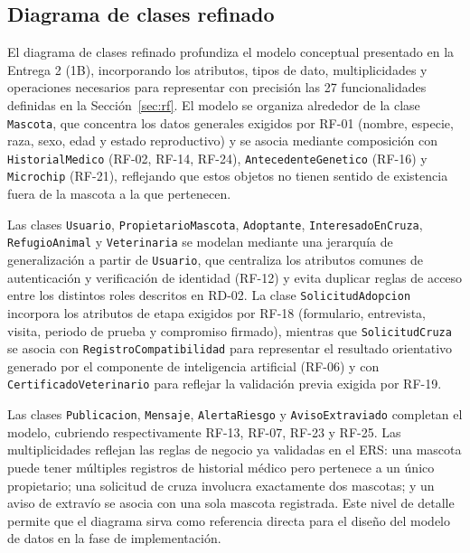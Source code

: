 \documentclass[journal,onecolumn]{IEEEtran}
\begin{document}
	\subsection{Diagrama de clases refinado}
	\label{sec:clases-refinado}
	
	El diagrama de clases refinado profundiza el modelo conceptual presentado en
	la Entrega 2 (1B), incorporando los atributos, tipos de dato,
	multiplicidades y operaciones necesarios para representar con precisión las
	27 funcionalidades definidas en la Sección~\ref{sec:rf}. El modelo se
	organiza alrededor de la clase \texttt{Mascota}, que concentra los datos
	generales exigidos por RF-01 (nombre, especie, raza, sexo, edad y estado
	reproductivo) y se asocia mediante composición con \texttt{HistorialMedico}
	(RF-02, RF-14, RF-24), \texttt{AntecedenteGenetico} (RF-16) y
	\texttt{Microchip} (RF-21), reflejando que estos objetos no tienen sentido
	de existencia fuera de la mascota a la que pertenecen.
	
	Las clases \texttt{Usuario}, \texttt{PropietarioMascota},
	\texttt{Adoptante}, \texttt{InteresadoEnCruza}, \texttt{RefugioAnimal} y
	\texttt{Veterinaria} se modelan mediante una jerarquía de generalización a
	partir de \texttt{Usuario}, que centraliza los atributos comunes de
	autenticación y verificación de identidad (RF-12) y evita duplicar reglas de
	acceso entre los distintos roles descritos en RD-02. La clase
	\texttt{SolicitudAdopcion} incorpora los atributos de etapa exigidos por
	RF-18 (formulario, entrevista, visita, periodo de prueba y compromiso
	firmado), mientras que \texttt{SolicitudCruza} se asocia con
	\texttt{RegistroCompatibilidad} para representar el resultado orientativo
	generado por el componente de inteligencia artificial (RF-06) y con
	\texttt{CertificadoVeterinario} para reflejar la validación previa exigida
	por RF-19.
	
	Las clases \texttt{Publicacion}, \texttt{Mensaje}, \texttt{AlertaRiesgo} y
	\texttt{AvisoExtraviado} completan el modelo, cubriendo respectivamente
	RF-13, RF-07, RF-23 y RF-25. Las multiplicidades reflejan las reglas de
	negocio ya validadas en el ERS: una mascota puede tener múltiples registros
	de historial médico pero pertenece a un único propietario; una solicitud de
	cruza involucra exactamente dos mascotas; y un aviso de extravío se asocia
	con una sola mascota registrada. Este nivel de detalle permite que el
	diagrama sirva como referencia directa para el diseño del modelo de datos en
	la fase de implementación.
	
\end{document}
